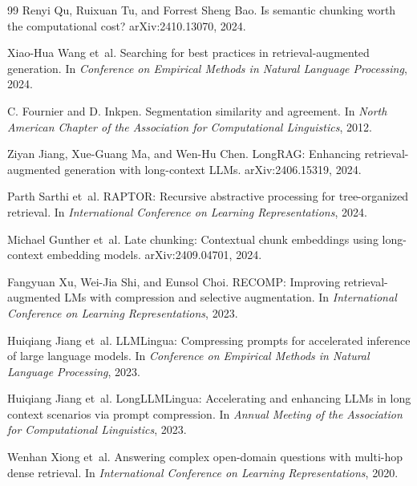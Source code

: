 \documentclass[10pt]{article}
\begin{document}
\begin{thebibliography}{99}
Renyi Qu, Ruixuan Tu, and Forrest Sheng Bao.
\newblock Is semantic chunking worth the computational cost?
\newblock arXiv:2410.13070, 2024.

Xiao-Hua Wang et~al.
\newblock Searching for best practices in retrieval-augmented generation.
\newblock In \emph{Conference on Empirical Methods in Natural Language Processing}, 2024.

C. Fournier and D. Inkpen.
\newblock Segmentation similarity and agreement.
\newblock In \emph{North American Chapter of the Association for Computational Linguistics}, 2012.

Ziyan Jiang, Xue-Guang Ma, and Wen-Hu Chen.
\newblock LongRAG: Enhancing retrieval-augmented generation with long-context LLMs.
\newblock arXiv:2406.15319, 2024.

Parth Sarthi et~al.
\newblock RAPTOR: Recursive abstractive processing for tree-organized retrieval.
\newblock In \emph{International Conference on Learning Representations}, 2024.

Michael Gunther et~al.
\newblock Late chunking: Contextual chunk embeddings using long-context embedding models.
\newblock arXiv:2409.04701, 2024.

Fangyuan Xu, Wei-Jia Shi, and Eunsol Choi.
\newblock RECOMP: Improving retrieval-augmented LMs with compression and selective augmentation.
\newblock In \emph{International Conference on Learning Representations}, 2023.

Huiqiang Jiang et~al.
\newblock LLMLingua: Compressing prompts for accelerated inference of large language models.
\newblock In \emph{Conference on Empirical Methods in Natural Language Processing}, 2023.

Huiqiang Jiang et~al.
\newblock LongLLMLingua: Accelerating and enhancing LLMs in long context scenarios via prompt compression.
\newblock In \emph{Annual Meeting of the Association for Computational Linguistics}, 2023.

Wenhan Xiong et~al.
\newblock Answering complex open-domain questions with multi-hop dense retrieval.
\newblock In \emph{International Conference on Learning Representations}, 2020.


\end{thebibliography}
\end{document}
